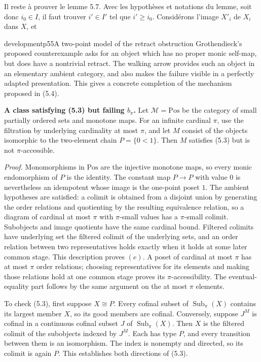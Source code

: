 Il reste à prouver le lemme 5.7. Avec les hypothèses et notations du lemme, soit donc $i_0 \in I$, il faut trouver $i' \in I'$ tel que $i' \geq i_0$. Considérons l'image $X'_i$ de $X_i$ dans $X$, et

\begin{dcomment}{development}{p55}{A two-point model of the retract obstruction}
Grothendieck's proposed counterexample asks for an object which has no proper monic self-map, but does have a nontrivial retract. The walking arrow provides such an object in an elementary ambient category, and also makes the failure visible in a perfectly adapted presentation. This gives a concrete completion of the mechanism proposed in (5.4).

\textbf{A class satisfying (5.3) but failing $b_\pi$.}\ours
Let $\mathcal M=\mathrm{Pos}$ be the category of small partially ordered sets and monotone maps. For an infinite cardinal $\pi$, use the filtration by underlying cardinality at most $\pi$, and let $M$ consist of the objects isomorphic to the two-element chain $P=\{0<1\}$. Then $M$ satisfies (5.3) but is not $\pi$-accessible.

\emph{Proof.} Monomorphisms in $\mathrm{Pos}$ are the injective monotone maps, so every monic endomorphism of $P$ is the identity. The constant map $P\to P$ with value $0$ is nevertheless an idempotent whose image is the one-point poset $1$. The ambient hypotheses are satisfied: a colimit is obtained from a disjoint union by generating the order relations and quotienting by the resulting equivalence relation, so a diagram of cardinal at most $\pi$ with $\pi$-small values has a $\pi$-small colimit. Subobjects and image quotients have the same cardinal bound. Filtered colimits have underlying set the filtered colimit of the underlying sets, and an order relation between two representatives holds exactly when it holds at some later common stage. This description proves $(e)$. A poset of cardinal at most $\pi$ has at most $\pi$ order relations; choosing representatives for its elements and making those relations hold at one common stage proves its $\pi$-accessibility. The eventual-equality part follows by the same argument on the at most $\pi$ elements.

To check (5.3), first suppose $X\cong P$. Every cofinal subset of $\operatorname{Sub}_{\pi}(X)$ contains its largest member $X$, so its good members are cofinal. Conversely, suppose $J^M$ is cofinal in a continuous cofinal subset $J$ of $\operatorname{Sub}_{\pi}(X)$. Then $X$ is the filtered colimit of the subobjects indexed by $J^M$. Each has type $P$, and every transition between them is an isomorphism. The index is nonempty and directed, so its colimit is again $P$. This establishes both directions of (5.3).


\end{dcomment}
